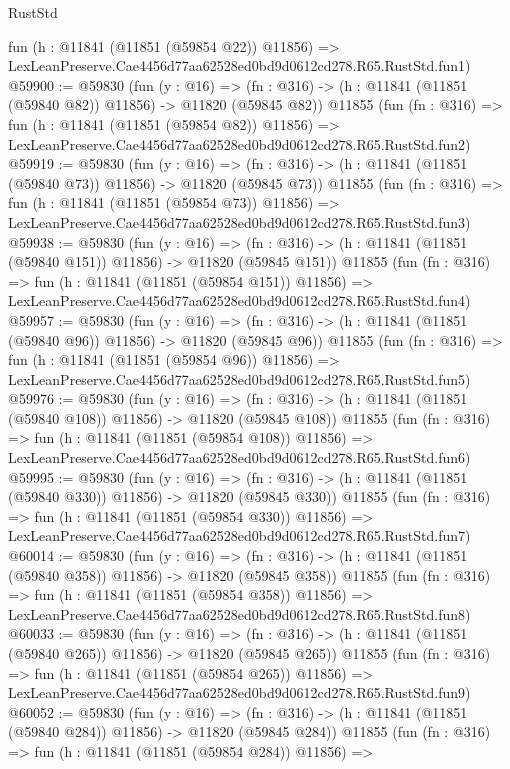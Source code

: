 \begin{lexlean}{RustStd}
\begin{coremodule}
    fun (h : @11841 (@11851 (@59854 @22)) @11856) =>
    LexLeanPreserve.Cae4456d77aa62528ed0bd9d0612cd278.R65.RustStd.fun1)
@59900 := @59830
    (fun (y : @16) =>
    (fn : @316) -> (h : @11841 (@11851 (@59840 @82)) @11856) -> @11820 (@59845 @82))
    @11855
    (fun (fn : @316) =>
    fun (h : @11841 (@11851 (@59854 @82)) @11856) =>
    LexLeanPreserve.Cae4456d77aa62528ed0bd9d0612cd278.R65.RustStd.fun2)
@59919 := @59830
    (fun (y : @16) =>
    (fn : @316) -> (h : @11841 (@11851 (@59840 @73)) @11856) -> @11820 (@59845 @73))
    @11855
    (fun (fn : @316) =>
    fun (h : @11841 (@11851 (@59854 @73)) @11856) =>
    LexLeanPreserve.Cae4456d77aa62528ed0bd9d0612cd278.R65.RustStd.fun3)
@59938 := @59830
    (fun (y : @16) =>
    (fn : @316) -> (h : @11841 (@11851 (@59840 @151)) @11856) -> @11820 (@59845 @151))
    @11855
    (fun (fn : @316) =>
    fun (h : @11841 (@11851 (@59854 @151)) @11856) =>
    LexLeanPreserve.Cae4456d77aa62528ed0bd9d0612cd278.R65.RustStd.fun4)
@59957 := @59830
    (fun (y : @16) =>
    (fn : @316) -> (h : @11841 (@11851 (@59840 @96)) @11856) -> @11820 (@59845 @96))
    @11855
    (fun (fn : @316) =>
    fun (h : @11841 (@11851 (@59854 @96)) @11856) =>
    LexLeanPreserve.Cae4456d77aa62528ed0bd9d0612cd278.R65.RustStd.fun5)
@59976 := @59830
    (fun (y : @16) =>
    (fn : @316) -> (h : @11841 (@11851 (@59840 @108)) @11856) -> @11820 (@59845 @108))
    @11855
    (fun (fn : @316) =>
    fun (h : @11841 (@11851 (@59854 @108)) @11856) =>
    LexLeanPreserve.Cae4456d77aa62528ed0bd9d0612cd278.R65.RustStd.fun6)
@59995 := @59830
    (fun (y : @16) =>
    (fn : @316) -> (h : @11841 (@11851 (@59840 @330)) @11856) -> @11820 (@59845 @330))
    @11855
    (fun (fn : @316) =>
    fun (h : @11841 (@11851 (@59854 @330)) @11856) =>
    LexLeanPreserve.Cae4456d77aa62528ed0bd9d0612cd278.R65.RustStd.fun7)
@60014 := @59830
    (fun (y : @16) =>
    (fn : @316) -> (h : @11841 (@11851 (@59840 @358)) @11856) -> @11820 (@59845 @358))
    @11855
    (fun (fn : @316) =>
    fun (h : @11841 (@11851 (@59854 @358)) @11856) =>
    LexLeanPreserve.Cae4456d77aa62528ed0bd9d0612cd278.R65.RustStd.fun8)
@60033 := @59830
    (fun (y : @16) =>
    (fn : @316) -> (h : @11841 (@11851 (@59840 @265)) @11856) -> @11820 (@59845 @265))
    @11855
    (fun (fn : @316) =>
    fun (h : @11841 (@11851 (@59854 @265)) @11856) =>
    LexLeanPreserve.Cae4456d77aa62528ed0bd9d0612cd278.R65.RustStd.fun9)
@60052 := @59830
    (fun (y : @16) =>
    (fn : @316) -> (h : @11841 (@11851 (@59840 @284)) @11856) -> @11820 (@59845 @284))
    @11855
    (fun (fn : @316) =>
    fun (h : @11841 (@11851 (@59854 @284)) @11856) =>

\end{coremodule}
\end{lexlean}
